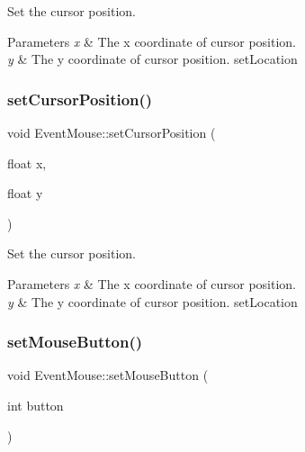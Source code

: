 Set the cursor position.


\begin{DoxyParams}{Parameters}
{\em x} & The x coordinate of cursor position. \\
\hline
{\em y} & The y coordinate of cursor position.  set\+Location \\
\hline
\end{DoxyParams}
\mbox{\label{classEventMouse_ae379cb198545104ef7c79a6599213f99}} 
\subsubsection{\texorpdfstring{set\+Cursor\+Position()}{setCursorPosition()}\hspace{0.1cm}{\footnotesize\ttfamily [2/2]}}
{\footnotesize\ttfamily void Event\+Mouse\+::set\+Cursor\+Position (\begin{DoxyParamCaption}\item[{float}]{x,  }\item[{float}]{y }\end{DoxyParamCaption})\hspace{0.3cm}{\ttfamily [inline]}}

Set the cursor position.


\begin{DoxyParams}{Parameters}
{\em x} & The x coordinate of cursor position. \\
\hline
{\em y} & The y coordinate of cursor position.  set\+Location \\
\hline
\end{DoxyParams}
\mbox{\label{classEventMouse_ad260eadf10819c3933dc2622952e83a3}} 
\subsubsection{\texorpdfstring{set\+Mouse\+Button()}{setMouseButton()}\hspace{0.1cm}{\footnotesize\ttfamily [1/2]}}
{\footnotesize\ttfamily void Event\+Mouse\+::set\+Mouse\+Button (\begin{DoxyParamCaption}\item[{int}]{button }\end{DoxyParamCaption})\hspace{0.3cm}{\ttfamily [inline]}}

